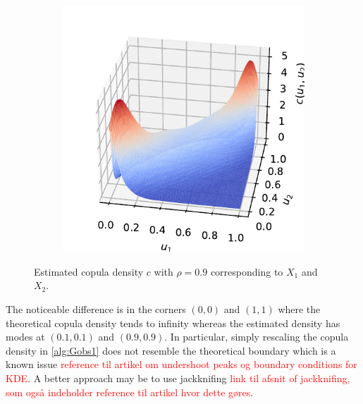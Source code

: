 \documentclass[../Thesis.tex]{subfiles}
\begin{document}
\begin{example}
\begin{figure}[H]
\begin{subfigure}[t]{0.45\linewidth}
            \caption{}
        \end{subfigure}%
        ~
        \begin{subfigure}[t]{0.5\linewidth}
            \includegraphics[width = \linewidth]{figures/ND examples/Gaussian copula sample pdf.pdf}
            \caption{}
        \end{subfigure}
        \caption{Estimated copula density $c$ with $\rho = 0.9$ corresponding to $X_1$ and $X_2$.}
        \label{fig:gaussian copula estimate}
    \end{figure}
    The noticeable difference is in the corners $(0,0)$ and $(1,1)$ where the theoretical copula density tends to infinity whereas the estimated density has modes at $(0.1,0.1)$ and $(0.9,0.9)$. In particular, simply rescaling the copula density in \autoref{alg:Gobs1} does not resemble the theoretical boundary which is a known issue \textcolor{red}{reference til artikel om undershoot peaks og boundary conditions for KDE}. A better approach may be to use jackknifing \textcolor{red}{link til afsnit of jackknifing, som også indeholder reference til artikel hvor dette gøres}.
    \begin{figure}[H]
        \centering
        \begin{subfigure}[t]{0.45\linewidth}
            \centering

\end{subfigure}
\end{figure}
\end{example}
\end{document}

